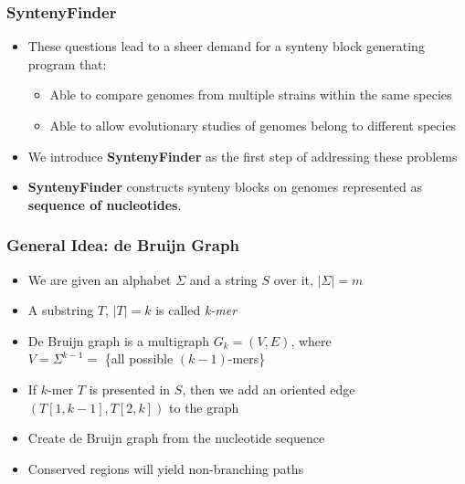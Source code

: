 \documentclass[svgnames,14pt]{beamer}
\begin{document}
\begin{frame}
\frametitle{SyntenyFinder}
\begin{itemize}
\item These questions lead to a sheer demand for a synteny block generating program that:
\begin{itemize}
\item Able to compare genomes from multiple strains within the same species
\item Able to allow evolutionary studies of genomes belong to different species
\end{itemize}
\pause
\item We introduce \textbf{SyntenyFinder} as the first step of addressing these problems
\pause
\item \textbf{SyntenyFinder} constructs synteny blocks on genomes represented as \textbf{sequence of nucleotides}. 
\end{itemize}
\end{frame}


\begin{frame}
\frametitle{General Idea: de Bruijn Graph}
\begin{itemize}
\item We are given an alphabet \( \Sigma \) and a string \( S \) over it, \(|\Sigma| = m \)
\item A substring \( T, \, |T| = k \) is called \textit{k-mer}
\item De Bruijn graph is a multigraph \( G_{k} = (V, E) \), where \\
\( V = \Sigma^{k - 1} = \) \{all possible \( (k - 1) \)-mers\} \\
\item If \(k\)-mer \( T \) is presented in \( S \), then we add an oriented edge \( (T[1, k - 1], T[2, k]) \) to the graph
\item Create de Bruijn graph from the nucleotide sequence
\item Conserved regions will yield non-branching paths
\end{itemize}
\end{frame}
\end{document}
